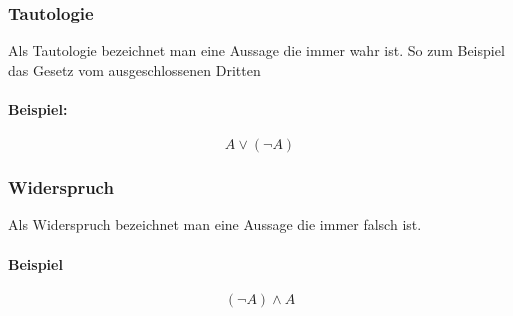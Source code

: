 \subsubsection{Tautologie}
Als Tautologie bezeichnet man eine Aussage die immer wahr ist. So zum Beispiel das Gesetz vom ausgeschlossenen Dritten

\paragraph*{Beispiel:}
\begin{equation*}
A \lor (\neg A)
\end{equation*}

\subsubsection{Widerspruch}
Als Widerspruch bezeichnet man eine Aussage die immer falsch ist. 

\paragraph*{Beispiel}
\begin{equation*}
(\neg A) \land A
\end{equation*}

